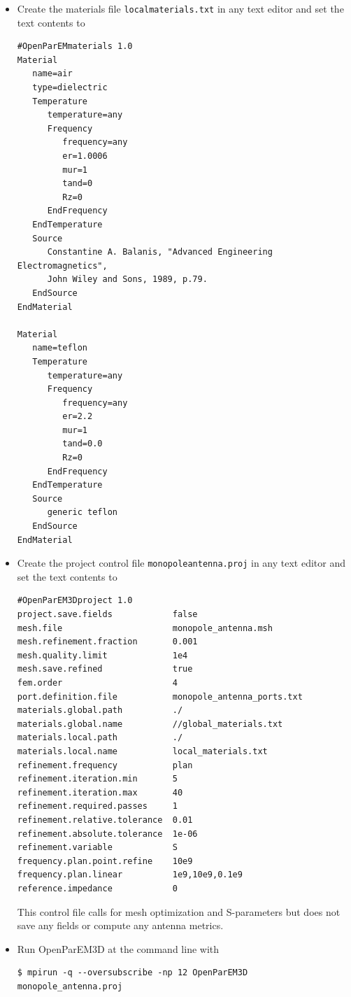 \documentclass[titlepage]{article}
\renewcommand\_{\textunderscore\linebreak[1]}
\begin{document}
\begin{itemize}

\item Create the materials file \texttt{local\_materials.txt} in any text editor and set the text contents to
\begin{Verbatim}[fontsize=\small]
#OpenParEMmaterials 1.0
Material
   name=air
   type=dielectric
   Temperature
      temperature=any
      Frequency
         frequency=any
         er=1.0006
         mur=1
         tand=0
         Rz=0
      EndFrequency
   EndTemperature
   Source
      Constantine A. Balanis, "Advanced Engineering Electromagnetics",
      John Wiley and Sons, 1989, p.79.
   EndSource
EndMaterial

Material
   name=teflon
   Temperature
      temperature=any
      Frequency
         frequency=any
         er=2.2
         mur=1
         tand=0.0
         Rz=0
      EndFrequency
   EndTemperature
   Source
      generic teflon
   EndSource
EndMaterial
\end{Verbatim}

\item Create the project control file \texttt{monopole\_antenna.proj} in any text editor and set the text contents to
\begin{Verbatim}[fontsize=\small]
#OpenParEM3Dproject 1.0
project.save.fields            false
mesh.file                      monopole_antenna.msh
mesh.refinement.fraction       0.001
mesh.quality.limit             1e4
mesh.save.refined              true
fem.order                      4
port.definition.file           monopole_antenna_ports.txt
materials.global.path          ./
materials.global.name          //global_materials.txt
materials.local.path           ./ 
materials.local.name           local_materials.txt
refinement.frequency           plan
refinement.iteration.min       5
refinement.iteration.max       40
refinement.required.passes     1
refinement.relative.tolerance  0.01
refinement.absolute.tolerance  1e-06
refinement.variable            S
frequency.plan.point.refine    10e9
frequency.plan.linear          1e9,10e9,0.1e9
reference.impedance            0
\end{Verbatim}
\noindent This control file calls for mesh optimization and S-parameters but does not save any fields or compute any antenna metrics.

\item Run OpenParEM3D at the command line with
\begin{Verbatim}[fontsize=\small]
   $ mpirun -q --oversubscribe -np 12 OpenParEM3D monopole_antenna.proj
\end{Verbatim}


\end{itemize}
\end{document}
